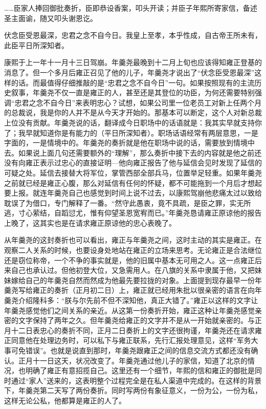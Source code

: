 
\begin{bookquote}……臣家人捧回御批奏折，臣即恭设香案，叩头开读；并臣子年熙所寄家信，备述圣主面谕，随又叩头谢恩讫。\end{bookquote}


\begin{bookquote}伏念臣受恩最深，忠君之念不自今日。我皇上至孝，本乎性成，自古帝王所未有，此臣平日所深知者。\end{bookquote}


康熙于上一年十一月十三日驾崩。年羹尧最晚到十二月上旬也应该得知雍正登基的消息了。但一个多月后雍正召见了他的儿子，年羹尧才说出了“伏念臣受恩最深”这样的话。而最值得仔细推敲的是“忠君之念不自今日”一句。如果按照现有的主流历史叙事，年羹尧不仅一直是雍正的人，甚至还是其登位的功臣，为何还需要特别强调“忠君之念不自今日”来表明忠心？试想，如果公司里一位老员工对新上任两个月的总裁说，我是你的人并不是从今天才开始的。那基本可以断定，这个人对新总裁上位没有贡献。年羹尧说的话，翻译成今日职场中的话语就是：我其实早就支持你了；我早就知道你是有能力的（平日所深知者）。职场话语经常有两层意思，一是字面的，一是情境中的。年羹尧的奏折就是他在职场中说的话，需要放到情境中去。如果说上面几句还需要额外的“理解”，那么奏折中接下去的内容就是他之前还没有向雍正表示过忠心的直接证明—他向雍正报告了他与延信会见时发现了延信的可疑之处。延信去接替大将军位，掌管西部全部兵马，位置举足轻重。如果年羹尧之前就已经是雍正心腹，那么对延信有任何的怀疑，都不可能拖到一个月后才想起要上报。就连年羹尧自己也感觉到时间上说不过去，以康熙驾崩他悲痛太过以致给耽误了为借口，专门解释了一番。“然守此愚衷，竟不具疏，是臣之罪，实无所逃，寸心萦结，自蹈愆尤，惟有仰望圣恩宽宥而已。”年羹尧恳请雍正原谅他的报告上晚了，这其实也是在请求雍正原谅他的忠心表晚了。



从年羹尧的这封奏折也可以看出，雍正与年羹尧之间，这时主动的其实是雍正。在观察二人关系的时候，也要设身处地站在雍正的立场来思考。无论雍正是合法继位还是窃位称帝，一个不争的事实就是，他的旧属中基本无可用之人。这一点雍正后来自己也承认过。但他初登大位，又急需用人。在八旗的关系中隶属于他，又把妹妹嫁给自己的年羹尧自然而然成为他最先要拉拢的对象。上面提到现存最早一份年羹尧写给雍正的奏折（正月初二日）上，雍正就已经用朱批以很亲密的语言在向年羹尧介绍隆科多：“朕与尔先前不但不深知他，真正大错了。”雍正以这样的文字让年羹尧感觉他们之间关系的亲近。从这第一份奏折开始，雍正这种让年羹尧感觉亲密的文字保持了两年之久。但年羹尧给雍正的文字并不是从一开始就亲密的。与正月十二日表忠心的奏折不同，正月二日奏折上的文字还很拘谨，年羹尧还在请求雍正同意他在处理边务时，可以私下与雍正联系，先行汇报处理意见，这样“军务大事可免错误”。也就是说直到那时，年羹尧跟雍正之间的信息交流方式都还没有确认。正月十一日这天，状况改变了。年羹尧通过他儿子的家信，知道了北京的情况，也明确了雍正有意招揽自己。这里还有一个细节，年熙的信和雍正的御批是同时通过“家人”送来的，这表明整个过程完全是在私人渠道中完成的。在这样的背景下，年羹尧第二天写了两份奏折。同时写两份有象征意义，一份为公，一份为私，这样无论公私，他都算是雍正的人了。


